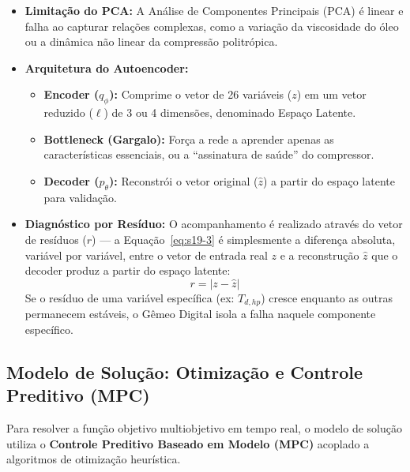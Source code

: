 \documentclass[12pt,a4paper]{article}
\numberwithin{equation}{section}
\numberwithin{table}{section}
\numberwithin{figure}{section}
\begin{document}
\begin{itemize}
	\item \textbf{Limitação do PCA:} A Análise de Componentes Principais (PCA) é linear e falha ao capturar relações complexas, como a variação da viscosidade do óleo ou a dinâmica não linear da compressão politrópica.
	\item \textbf{Arquitetura do Autoencoder:}
	\begin{itemize}
		\item \textbf{Encoder ($q_{\phi}$):} Comprime o vetor de 26 variáveis ($z$) em um vetor reduzido ($\ell$) de 3 ou 4 dimensões, denominado Espaço Latente.
		\item \textbf{Bottleneck (Gargalo):} Força a rede a aprender apenas as características essenciais, ou a ``assinatura de saúde'' do compressor.
		\item \textbf{Decoder ($p_{\theta}$):} Reconstrói o vetor original ($\hat{z}$) a partir do espaço latente para validação.
	\end{itemize}
	\item \textbf{Diagnóstico por Resíduo:}
	O acompanhamento é realizado através do vetor de resíduos ($r$) — a Equação~\eqref{eq:s19-3} é simplesmente a diferença absoluta, variável por variável, entre o vetor de entrada real $z$ e a reconstrução $\hat{z}$ que o decoder produz a partir do espaço latente:
	\begin{equation}\label{eq:s19-3}
 r = | z - \hat{z} |
\end{equation}
	Se o resíduo de uma variável específica (ex: $T_{d,hp}$) cresce enquanto as outras permanecem estáveis, o Gêmeo Digital isola a falha naquele componente específico.
\end{itemize}

\subsection{Modelo de Solução: Otimização e Controle Preditivo (MPC)}

Para resolver a função objetivo multiobjetivo em tempo real, o modelo de solução utiliza o \textbf{Controle Preditivo Baseado em Modelo (MPC)} acoplado a algoritmos de otimização heurística.
\end{document}
